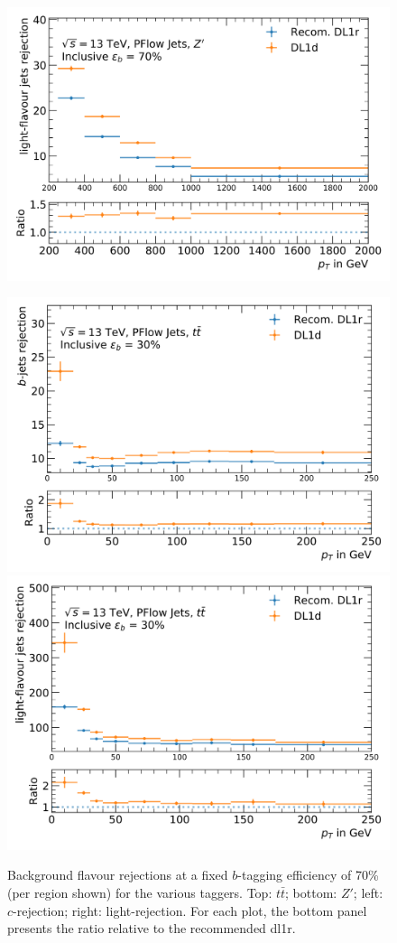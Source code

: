 \begin{center}
\begin{figure}[h!]
{  \includegraphics[scale=0.425]{Images/FTAG/DL1d/perpT/zpbu.png}
}
\caption{Background flavour rejections at a fixed $b$-tagging efficiency of 70\% (per region shown) for the various taggers. Top: $t\bar{t}$; bottom: $Z'$; left: $c$-rejection; right: light-rejection. For each plot, the bottom panel presents the ratio relative to the recommended \gls{dl1r}.}
\label{fig:ptDL1dtt}
\bigskip
\centerline{
\includegraphics[scale=0.425]{Images/FTAG/DL1d/perpT/ttcb.png}
\includegraphics[scale=0.425]{Images/FTAG/DL1d/perpT/ttcu.png}}

\end{figure}
\end{center}
